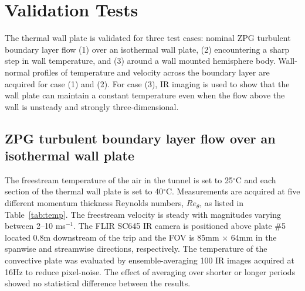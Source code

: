 \section{Validation Tests}
The thermal wall plate is validated for three test cases: nominal ZPG turbulent boundary layer flow (1) over an isothermal wall plate, (2) encountering a sharp step in wall temperature, and (3) around a wall mounted hemisphere body.  Wall-normal profiles of temperature and velocity across  the boundary layer are acquired for case (1) and (2). For case (3), IR imaging is used to show that the wall plate can maintain a constant temperature even when the flow above the wall is unsteady and strongly three-dimensional. 


\subsection{ZPG turbulent boundary layer flow over an isothermal wall plate}
The freestream temperature  of the air in the tunnel is set to 25$^\circ$C and each section of the thermal wall plate is set to 40$^\circ$C. Measurements are acquired at five different momentum thickness Reynolds numbers, $Re_\theta$, as listed in Table~\ref{tab:temp}. The freestream velocity is steady with magnitudes varying between 2--10 ms$^{-1}$. The FLIR SC645 IR camera is positioned above plate \#5 located 0.8m downstream of the trip and the FOV is 85mm $\times$ 64mm in the spanwise and streamwise directions, respectively. The temperature of the convective plate was evaluated by ensemble-averaging 100 IR images acquired at 16Hz to reduce pixel-noise. The effect of averaging over shorter or longer periods showed no statistical difference between the results.

